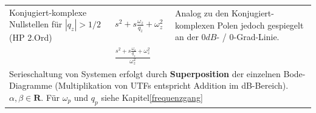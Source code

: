 \begin{landscape}
\begin{longtable}{|p{5cm}|l|ll|ll|}
		\\ \hline	
		Konjugiert-komplexe Nullstellen
		für $|q_z| > 1/2$ (HP 2.Ord)&
		$s^2+s\frac{\omega_z}{q_z}+\omega_z^2$ &
		\multicolumn{4}{l|}{
			Analog zu den Konjugiert-komplexen Polen jedoch gespiegelt an der $0dB$- / $0$-Grad-Linie.
		}
		\\
		&
		$\frac{s^2+s\frac{\omega_z}{q_z}+\omega_z^2}{\omega_z^2}$ &
		\multicolumn{4}{l|}{}
		\\ \hline
		\multicolumn{6}{|p{21cm}|}{
			Serieschaltung von Systemen erfolgt durch \textbf{Superposition} der einzelnen Bode-Diagramme 
			(Multiplikation von UTFs entspricht Addition im	dB-Bereich). $\alpha , \beta \in \mathbf{R}$. 
			Für $\omega_p$ und $q_p$ siehe Kapitel\ref{frequenzgang}
		}
		\\ \hline
	\end{longtable}
	\renewcommand{\arraystretch}{\arraystretchOriginal}
\end{landscape}
\clearpage

